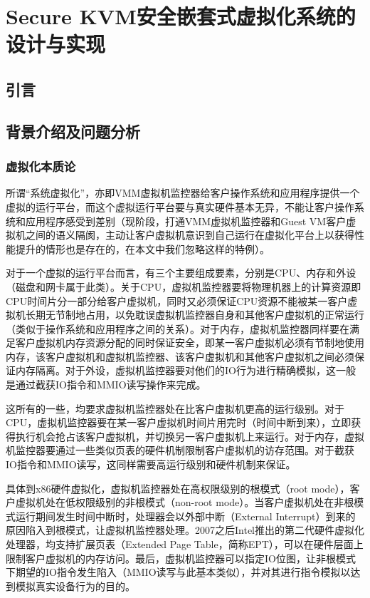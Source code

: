 
\chapter{Secure KVM安全嵌套式虚拟化系统的设计与实现}
\label{chap:securekvm}



\section{引言}

\section{背景介绍及问题分析}

\subsection{虚拟化本质论}

所谓“系统虚拟化”，亦即VMM虚拟机监控器给客户操作系统和应用程序提供一个虚拟的运行平台，而这个虚拟运行平台要与真实硬件基本无异，不能让客户操作系统和应用程序感受到差别（现阶段，打通VMM虚拟机监控器和Guest VM客户虚拟机之间的语义隔阂，主动让客户虚拟机意识到自己运行在虚拟化平台上以获得性能提升的情形也是存在的，在本文中我们忽略这样的特例）。

对于一个虚拟的运行平台而言，有三个主要组成要素，分别是CPU、内存和外设（磁盘和网卡属于此类）。关于CPU，虚拟机监控器要将物理机器上的计算资源即CPU时间片分一部分给客户虚拟机，同时又必须保证CPU资源不能被某一客户虚拟机长期无节制地占用，以免耽误虚拟机监控器自身和其他客户虚拟机的正常运行（类似于操作系统和应用程序之间的关系）。对于内存，虚拟机监控器同样要在满足客户虚拟机内存资源分配的同时保证安全，即某一客户虚拟机必须有节制地使用内存，该客户虚拟机和虚拟机监控器、该客户虚拟机和其他客户虚拟机之间必须保证内存隔离。对于外设，虚拟机监控器要对他们的IO行为进行精确模拟，这一般是通过截获IO指令和MMIO读写操作来完成。

这所有的一些，均要求虚拟机监控器处在比客户虚拟机更高的运行级别。对于CPU，虚拟机监控器要在某一客户虚拟机时间片用完时（时间中断到来），立即获得执行机会抢占该客户虚拟机，并切换另一客户虚拟机上来运行。对于内存，虚拟机监控器要通过一些类似页表的硬件机制限制客户虚拟机的访存范围。对于截获IO指令和MMIO读写，这同样需要高运行级别和硬件机制来保证。

具体到x86硬件虚拟化，虚拟机监控器处在高权限级别的根模式（root mode），客户虚拟机处在低权限级别的非根模式（non-root mode）。当客户虚拟机处在非根模式运行期间发生时间中断时，处理器会以外部中断（External Interrupt）到来的原因陷入到根模式，让虚拟机监控器处理。2007之后Intel推出的第二代硬件虚拟化处理器，均支持扩展页表（Extended Page Table，简称EPT），可以在硬件层面上限制客户虚拟机的内存访问。最后，虚拟机监控器可以指定IO位图，让非根模式下期望的IO指令发生陷入（MMIO读写与此基本类似），并对其进行指令模拟以达到模拟真实设备行为的目的。

